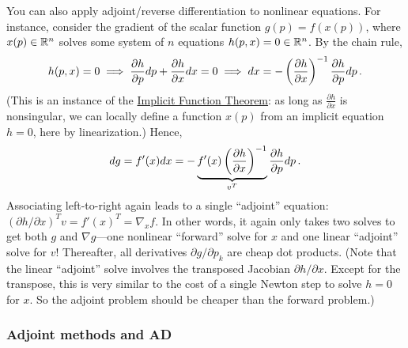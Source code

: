 You can also apply adjoint/reverse differentiation to nonlinear equations. For instance, consider the gradient of the scalar function $g(p) = f(x(p))$, where $x(p)\in \mathbb R^n$ solves some system of $n$ equations $h(p,x) = 0 \in \mathbb R^n$. By the chain rule, $$h(p,x) = 0 \implies \frac{\partial h}{\partial p} d p + \frac{\partial  h}{\partial x} d x = 0 \implies d x = -\left(\frac{\partial  h}{\partial x}\right)^{-1}  \frac{\partial h}{\partial p}   d p \,.$$ (This is an instance of the \href{https://en.wikipedia.org/wiki/Implicit_function_theorem}{Implicit Function Theorem}: as long as 
$\frac{\partial  h}{\partial x}$ is nonsingular, we can locally define a function $x(p)$ from an implicit equation $h=0$, here by linearization.) 
Hence, 
\[
d g = f'(x) d x = - \underbrace{ f'(x) \left(\frac{\partial  h}{\partial x}\right)^{-1} }_{v^T} \frac{\partial h}{\partial p} d p \, .
\]
Associating left-to-right again leads to a single ``adjoint'' equation: $(\partial h/\partial x)^T v = f'(x)^T = \nabla_x f$. In other words, it again only takes two solves to get both $g$ and $\nabla g$---one nonlinear ``forward'' solve for $x$ and one linear ``adjoint'' solve for $v$! Thereafter, all derivatives $\partial g/\partial p_k$ are cheap dot products.   (Note that the linear ``adjoint'' solve involves the transposed Jacobian $\partial h/\partial x$.  Except for the transpose, this is very similar to the cost of a single Newton step to solve $h=0$ for $x$.  So the adjoint problem should be cheaper than the forward problem.)

\subsubsection{Adjoint methods and AD}

